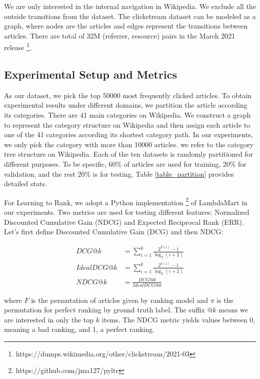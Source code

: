 We are only interested in the internal navigation in Wikipedia. We exclude all the outside transitions from the dataset. The clickstream dataset can be modeled as a graph, where nodes are the articles and edges represent the transitions between articles. There are total of 32M (referrer, resource) pairs in the March 2021 release \footnote{https://dumps.wikimedia.org/other/clickstream/2021-03}.

\subsection{Experimental Setup and Metrics}

As our dataset, we pick the top 50000 most frequently clicked articles. To obtain experimental results under different domains, we partition the article according its categories. There are 41 main categories on Wikipedia. We construct a graph to represent the category structure on Wikipedia and then assign each article to one of the 41 categories according its shortest category path. In our experiments, we only pick the category with more than 10000 articles. we refer to the category tree structure on Wikipedia. Each of the ten datasets is randomly partitioned for different purposes. To be specific, 60\% of articles are used for training, 20\% for validation, and the rest 20\% is for testing. Table \ref{table_partition} provides detailed stats.

For Learning to Rank, we adopt a Python implementation \footnote{https://github.com/jma127/pyltr} of LambdaMart \cite{wu2010adapting} in our experiments. Two metrics are used for testing different features: Normalized Discounted Cumulative Gain (NDCG) and Expected Reciprocal Rank (ERR). Let's first define Discounted Cumulative Gain (DCG) and then NDCG:

\begin{align*}
DCG@k & = \sum_{i=1}^{k} \frac{2^{F(i)} - 1}{\log_{2} (i+2)} \\
IdealDCG@k & = \sum_{i=1}^{k} \frac{2^{\pi(i)} - 1}{\log_{2} (i+2)} \\
NDCG@k & = \frac{DCG@k} {IdealDCG@k}
\end{align*}

where $F$ is the permutation of articles given by ranking model and $\pi$ is the permutation for perfect ranking by ground truth label. The suffix $@k$ means we are interested in only the top $k$ items. The NDCG metric yields values between 0, meaning a bad ranking, and 1, a perfect ranking.

